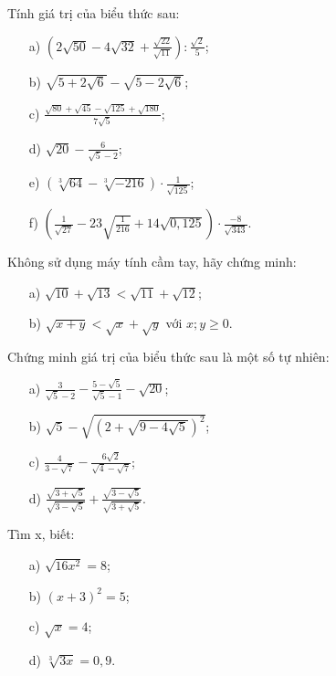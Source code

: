 \documentclass[%
    fontsize=12pt,%
    chapterprefix=false,%
    open=right,%
    twoside=false,%
    numbers=noenddot,%
    headings=optiontohead,%
    final,%
    DIV=15,%
    parskip=half %
]{scrbook}
\begin{document}
\begin{tuluan}

\item Tính giá trị của biểu thức sau:
\begin{enumerate}[label=\alph*)]
  \item[a)] $\left(2\sqrt{50} - 4\sqrt{32} + \frac{\sqrt{22}}{\sqrt{11}}\right) : \frac{\sqrt{2}}{5}$;
  \item[b)] $\sqrt{5 + 2\sqrt{6}} - \sqrt{5 - 2\sqrt{6}}$;
  \item[c)] $\frac{\sqrt{80} + \sqrt{45} - \sqrt{125} + \sqrt{180}}{7\sqrt{5}}$;
  \item[d)] $\sqrt{20} - \frac{6}{\sqrt{5} - 2}$;
  \item[e)] $(\sqrt[3]{64} - \sqrt[3]{-216})\cdot \frac{1}{\sqrt{125}}$;
  \item[f)] $\left(\frac{1}{\sqrt{27}} - 23\sqrt{\frac{1}{216}} + 14\sqrt{0,125}\right)\cdot \frac{-8}{\sqrt{343}}$.
\end{enumerate}

\item Không sử dụng máy tính cầm tay, hãy chứng minh:
\begin{enumerate}[label=\alph*)]
  \item[a)] $\sqrt{10} + \sqrt{13} < \sqrt{11} + \sqrt{12}$;
  \item[b)] $\sqrt{x + y} < \sqrt{x} + \sqrt{y}$ với $x; y \geq 0$.
\end{enumerate}

\item Chứng minh giá trị của biểu thức sau là một số tự nhiên:
\begin{enumerate}[label=\alph*)]
  \item[a)] $\frac{3}{\sqrt{5} - 2} - \frac{5 - \sqrt{5}}{\sqrt{5} - 1} - \sqrt{20}$;
  \item[b)] $\sqrt{5} - \sqrt{(2 + \sqrt{9 - 4\sqrt{5}})^2}$;
  \item[c)] $\frac{4}{3 - \sqrt{7}} - \frac{6\sqrt{2}}{\sqrt{4} - \sqrt{7}}$;
  \item[d)] $\frac{\sqrt{3 + \sqrt{5}}}{\sqrt{3 - \sqrt{5}}} + \frac{\sqrt{3 - \sqrt{5}}}{\sqrt{3 + \sqrt{5}}}$.
\end{enumerate}

\item Tìm x, biết:
\begin{enumerate}[label=\alph*)]
  \item[a)] $\sqrt{16x^2} = 8$;
  \item[b)] $(x + 3)^2 = 5$;
  \item[c)] $\sqrt{x} = 4$;
  \item[d)] $\sqrt[3]{3x} = 0,9$.
\end{enumerate}


\end{tuluan}
\end{document}
